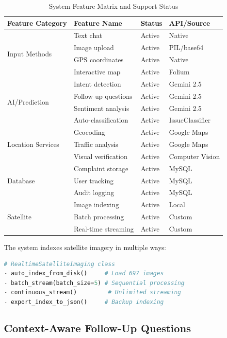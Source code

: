 \documentclass[11pt,a4paper]{article}
\begin{document}
\begin{table}[H]
\centering
\caption{System Feature Matrix and Support Status}
\label{tab:features}
\begin{tabular}{|l|l|l|l|}
\hline
\textbf{Feature Category} & \textbf{Feature Name} & \textbf{Status} & \textbf{API/Source} \\
\hline
\multirow{4}{*}{Input Methods} & Text chat & Active & Native \\
 & Image upload & Active & PIL/base64 \\
 & GPS coordinates & Active & Native \\
 & Interactive map & Active & Folium \\
\hline
\multirow{4}{*}{AI/Prediction} & Intent detection & Active & Gemini 2.5 \\
 & Follow-up questions & Active & Gemini 2.5 \\
 & Sentiment analysis & Active & Gemini 2.5 \\
 & Auto-classification & Active & IssueClassifier \\
\hline
\multirow{3}{*}{Location Services} & Geocoding & Active & Google Maps \\
 & Traffic analysis & Active & Google Maps \\
 & Visual verification & Active & Computer Vision \\
\hline
\multirow{3}{*}{Database} & Complaint storage & Active & MySQL \\
 & User tracking & Active & MySQL \\
 & Audit logging & Active & MySQL \\
\hline
\multirow{3}{*}{Satellite} & Image indexing & Active & Local \\
 & Batch processing & Active & Custom \\
 & Real-time streaming & Active & Custom \\
\hline
\end{tabular}
\end{table}

The system indexes satellite imagery in multiple ways:

\begin{lstlisting}[language=Python]
# RealtimeSatelliteImaging class
- auto_index_from_disk()     # Load 697 images
- batch_stream(batch_size=5) # Sequential processing
- continuous_stream()         # Unlimited streaming
- export_index_to_json()     # Backup indexing
\end{lstlisting}

\subsection{Context-Aware Follow-Up Questions}
\end{document}
